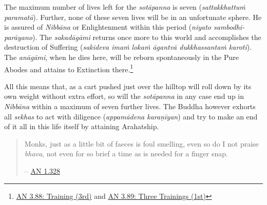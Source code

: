 The maximum number of lives left for the \emph{sotāpanna} is seven (\emph{sattakkhattuṁ paramatā}). Further, none of these seven lives will be in an unfortunate sphere. He is assured of \emph{Nibbāna} or Enlightenment within this period (\emph{niyato sambodhi-parāyano}). The \emph{sakadāgāmi} returns once more to this world and accomplishes the destruction of Suffering (\emph{sakideva imaṁ lokaṁ āgantvā dukkhassantaṁ karoti}). The \emph{anāgāmi}, when he dies here, will be reborn spontaneously in the Pure Abodes and attains to Extinction there.\footnote{\href{https://suttacentral.net/an3.88/en/sujato}{AN 3.88: Training (3rd)} and \href{https://suttacentral.net/an3.89/en/sujato}{AN 3.89: Three Trainings (1st)}}

All this means that, as a cart pushed just over the hilltop will roll down by its own weight without extra effort, so will the \emph{sotāpanna} in any case end up in \emph{Nibbāna} within a maximum of seven further lives. The Buddha however exhorts all \emph{sekhas} to act with diligence (\emph{appamādena karaṇīyan}) and try to make an end of it all in this life itself by attaining Arahatship.

\begin{quote}
Monks, just as a little bit of faeces is foul smelling, even so do I not praise \emph{bhava}, not even for so brief a time as is needed for a finger snap.

 -- \href{https://suttacentral.net/an1.316-332/en/sujato}{AN 1.328}
\end{quote}
